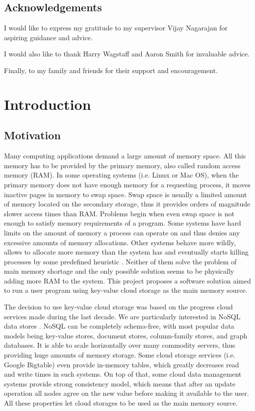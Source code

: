 \documentclass[bsc,frontabs,twoside,singlespacing,parskip,deptreport]{infthesis}     %
\begin{document}
\section*{Acknowledgements}

I would like to express my gratitude to my supervisor Vijay Nagarajan for aspiring guidance and advice.

I would also like to thank Harry Wagstaff and Aaron Smith for invaluable advice.

Finally, to my family and friends for their support and encouragement.

\tableofcontents



\chapter{Introduction}

\section{Motivation}

Many computing applications demand a large amount of memory space. All this memory has to be provided by the primary memory, also called random access memory (RAM). In some operating systems (i.e. Linux or Mac OS), when the primary memory does not have enough memory for a requesting process, it moves inactive pages in memory to swap space. Swap space is usually a limited amount of memory located on the secondary storage, thus it provides orders of magnitude slower access times than RAM. Problems begin when even swap space is not enough to satisfy memory requirements of a program. Some systems have hard limits on the amount of memory a process can operate on and thus denies any excessive amounts of memory allocations. Other systems behave more wildly, allows to allocate more memory than the system has and eventually starts killing processes by some predefined heuristic \citep{run_out_of_mem}. Neither of them solve the problem of main memory shortage and the only possible solution seems to be physically adding more RAM to the system. This project proposes a software solution aimed to run a user program using key-value cloud storage as the main memory source.

The decision to use key-value cloud storage was based on the progress cloud services made during the last decade. We are particularly interested in NoSQL data stores \citep{nosql-data-stores}. NoSQL can be completely schema-free, with most popular data models being key-value stores, document stores, column-family stores, and graph databases. It is able to scale horizontally over many commodity servers, thus providing huge amounts of memory storage. Some cloud storage services (i.e. Google Bigtable) even provide in-memory tables, which greatly decreases read and write times in such systems.  On top of that, some cloud data management systems provide strong consistency model, which means that after an update operation all nodes agree on the new value before making it available to the user. All these properties let cloud storages to be used as the main memory source.
\end{document}
